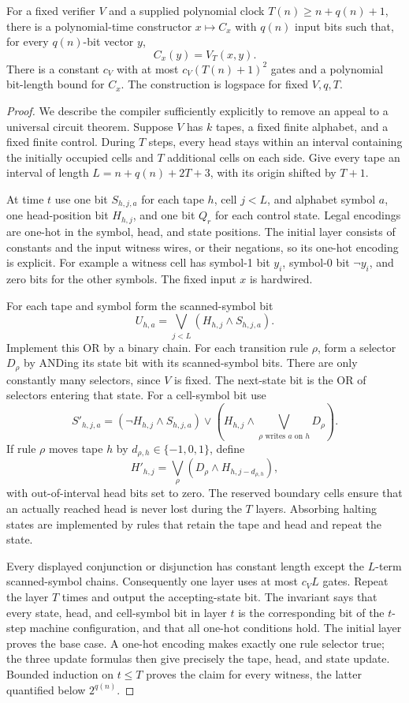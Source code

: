 \begin{theorem}\label{thm:N03}
For a fixed verifier $V$ and a supplied polynomial clock $T(n)\ge n+q(n)+1$,
there is a polynomial-time constructor $x\mapsto C_x$ with $q(n)$ input bits
such that, for every $q(n)$-bit vector $y$,
\[
 C_x(y)=V_T(x,y).
\]
There is a constant $c_V$ with at most $c_V(T(n)+1)^2$ gates and a polynomial
bit-length bound for $C_x$. The construction is logspace for fixed $V,q,T$.
\end{theorem}
\begin{proof}
We describe the compiler sufficiently explicitly to remove an appeal to a
universal circuit theorem. Suppose $V$ has $k$ tapes, a fixed finite alphabet,
and a fixed finite control. During $T$ steps, every head stays within an
interval containing the initially occupied cells and $T$ additional cells
on each side. Give every tape an interval of length
$L=n+q(n)+2T+3$, with its origin shifted by $T+1$.

At time $t$ use one bit $S_{h,j,a}$ for each tape $h$, cell $j<L$, and alphabet
symbol $a$, one head-position bit $H_{h,j}$, and one bit $Q_r$ for each control
state. Legal encodings are one-hot in the symbol, head, and state positions.
The initial layer consists of constants and the input witness wires, or their
negations, so its one-hot encoding is explicit. For example a witness cell
has symbol-1 bit $y_i$, symbol-0 bit $\neg y_i$, and zero bits for the other
symbols. The fixed input $x$ is hardwired.

For each tape and symbol form the scanned-symbol bit
\[
 U_{h,a}=\bigvee_{j<L}(H_{h,j}\wedge S_{h,j,a}).
\]
Implement this OR by a binary chain. For each transition rule $\rho$, form a
selector $D_\rho$ by ANDing its state bit with its scanned-symbol bits. There
are only constantly many selectors, since $V$ is fixed. The next-state bit is
the OR of selectors entering that state. For a cell-symbol bit use
\[
 S'_{h,j,a}=(\neg H_{h,j}\wedge S_{h,j,a})
 \vee\left(H_{h,j}\wedge
       \bigvee_{\rho\text{ writes }a\text{ on }h}D_\rho\right).
\]
If rule $\rho$ moves tape $h$ by $d_{\rho,h}\in\{-1,0,1\}$, define
\[
 H'_{h,j}=\bigvee_\rho(D_\rho\wedge H_{h,j-d_{\rho,h}}),
\]
with out-of-interval head bits set to zero. The reserved boundary cells ensure
that an actually reached head is never lost during the $T$ layers. Absorbing
halting states are implemented by rules that retain the tape and head and
repeat the state.

Every displayed conjunction or disjunction has constant length except the
$L$-term scanned-symbol chains. Consequently one layer uses at most $c_V L$
gates. Repeat the layer $T$ times and output the accepting-state bit. The
invariant says that every state, head, and cell-symbol bit in layer $t$ is the
corresponding bit of the $t$-step machine configuration, and that all one-hot
conditions hold. The initial layer proves the base case. A one-hot encoding
makes exactly one rule selector true; the three update formulas then give
precisely the tape, head, and state update. Bounded induction on $t\le T$
proves the claim for every witness, the latter quantified below $2^{q(n)}$.


\end{proof}
